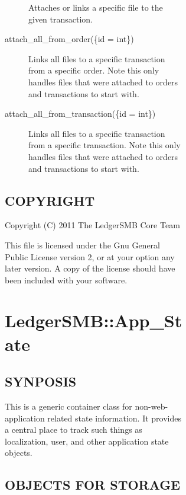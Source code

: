 \begin{description}
\begin{description}
\begin{description}
\begin{description}
\begin{description}
\begin{description}
Attaches or links a specific file to the given transaction.


\item[{attach\_all\_from\_order(\{id = int\})}] \mbox{}

Links all files to a specific transaction from a specific order.  Note this 
only handles files that were attached to orders and transactions to start with.


\item[{attach\_all\_from\_transaction(\{id = int\})}] \mbox{}

Links all files to a specific transaction from a specific transaction.  Note 
this only handles files that were attached to orders and transactions to start 
with.

\end{description}
\subsection*{COPYRIGHT\label{LedgerSMB::File::Order_COPYRIGHT}}


Copyright (C) 2011 The LedgerSMB Core Team



This file is licensed under the Gnu General Public License version 2, or at your
option any later version.  A copy of the license should have been included with
your software.

\section{LedgerSMB::App\_State\label{LedgerSMB::App_State}}




\subsection*{SYNPOSIS\label{LedgerSMB::App_State_SYNPOSIS}}


This is a generic container class for non-web-application related state
information.  It provides a central place to track such things as localization,
user, and other application state objects.

\subsection*{OBJECTS FOR STORAGE\label{LedgerSMB::App_State_OBJECTS_FOR_STORAGE}}



\end{description}
\end{description}
\end{description}
\end{description}
\end{description}
